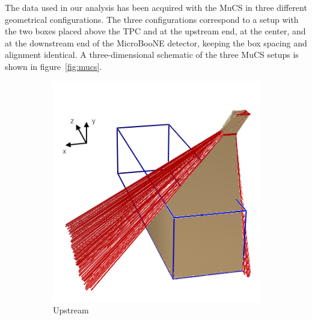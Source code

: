 \documentclass[a4paper,11pt]{article}
\begin{document}
The data used in our analysis has been acquired with the MuCS in three different geometrical configurations. The three configurations correspond to a setup with the two boxes placed above the TPC and at the upstream end, at the center, and at the downstream end of the MicroBooNE detector, keeping the box spacing and alignment identical.
A three-dimensional schematic of the three MuCS setups is shown in figure~\ref{fig:mucs}.

\begin{figure}[htbp]
  \begin{subfigure}{0.30\textwidth}
    \includegraphics[width=\linewidth]{figures/upstream.png}
    \caption{Upstream} \label{fig:upstream}
  \end{subfigure}
  \begin{subfigure}{0.30\textwidth}

\end{subfigure}
\end{figure}
\end{document}
